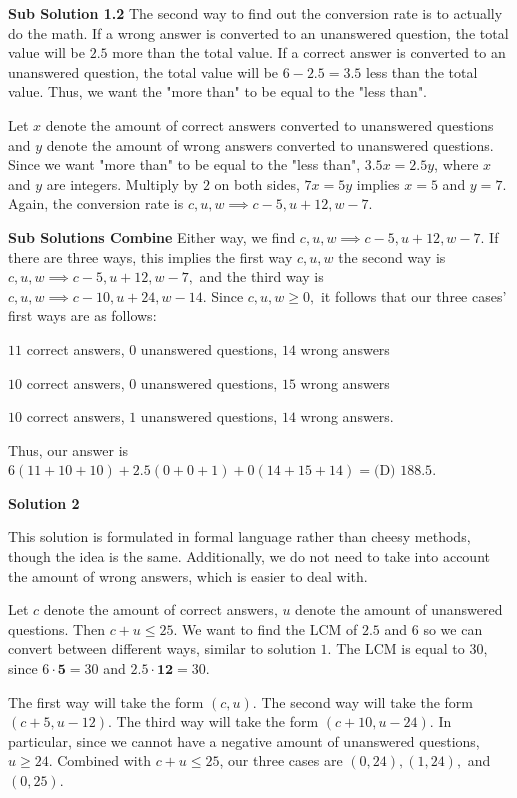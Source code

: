\begin{enumerate}
 \textbf{Sub Solution 1.2} The second way to find out the conversion rate is to actually do the math. If a wrong answer is converted to an unanswered question, the total value will be $2.5$ more than the total value. If a correct answer is converted to an unanswered question, the total value will be $6-2.5=3.5$ less than the total value. Thus, we want the "more than" to be equal to the "less than". 

 Let $x$ denote the amount of correct answers converted to unanswered questions and $y$ denote the amount of wrong answers converted to unanswered questions. Since we want "more than" to be equal to the "less than", $3.5x=2.5y$, where $x$ and $y$ are integers. Multiply by $2$ on both sides, $7x=5y$ implies $x=5$ and $y=7.$ Again, the conversion rate is $c, u, w \implies c-5, u+12, w-7.$ 

 \textbf{Sub Solutions Combine} Either way, we find $c, u, w \implies c-5, u+12, w-7.$ If there are three ways, this implies the first way $c, u, w$ the second way is $c, u, w \implies c-5, u+12, w-7,$ and the third way is $c, u, w \implies c-10, u+24, w-14.$ Since $c, u, w \geq0,$ it follows that our three cases' first ways are as follows:

 
$11$ correct answers, $0$ unanswered questions, $14$ wrong answers

 $10$ correct answers, $0$ unanswered questions, $15$ wrong answers

 $10$ correct answers, $1$ unanswered questions, $14$ wrong answers.

 
Thus, our answer is $6(11+10+10)+2.5(0+0+1)+0(14+15+14)=\boxed {\text{(D) }188.5}.$




\textbf{Solution 2}

This solution is formulated in formal language rather than cheesy methods, though the idea is the same. Additionally, we do not need to take into account the amount of wrong answers, which is easier to deal with.

 Let $c$ denote the amount of correct answers, $u$ denote the amount of unanswered questions. Then $c+u \leq 25.$ We want to find the LCM of $2.5$ and $6$ so we can convert between different ways, similar to solution $1.$ The LCM is equal to $30$, since $6 \cdot \textbf{5}=30$ and $2.5 \cdot \textbf{12}=30.$ 

 The first way will take the form $(c,u).$ The second way will take the form $(c+5, u-12).$ The third way will take the form $(c+10, u-24).$ In particular, since we cannot have a negative amount of unanswered questions, $u \geq 24.$ Combined with $c+u \leq 25$, our three cases are $(0,24), (1,24),$ and $(0,25).$


\end{enumerate}
